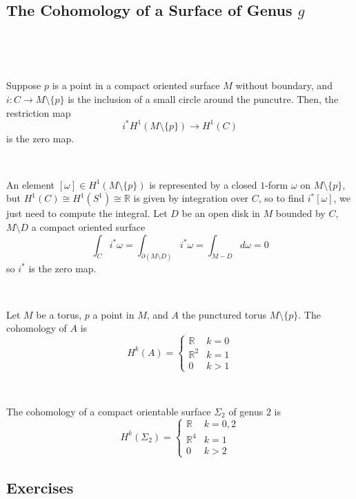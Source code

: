 \documentclass{article}
\begin{document}
\subsection{The Cohomology of a Surface of Genus $g$}
\

\begin{lemma}
\

Suppose $p$ is a point in a compact oriented surface $M$ without boundary, and $i: C \to M \setminus \{p\}$ is the inclusion of a small circle around the puncutre. Then, the restriction map $$i^* H^1(M \setminus \{p\}) \to H^1(C)$$is the zero map.
\end{lemma}

\begin{customproof}
\

An element $[\omega] \in H^1(M \setminus \{p\})$ is represented by a closed $1$-form $\omega$ on $M \setminus \{p\}$, but $H^1(C) \cong H^1(S^1) \cong \mathbb{R}$ is given by integration over $C$, so to find $i^*[\omega]$, we just need to compute the integral. Let $D$ be an open disk in $M$ bounded by $C$, $M\setminus D$ a compact oriented surface $$\int_C i^*\omega = \int_{\partial (M \setminus D)} i^* \omega = \int_{M-D} d\omega = 0$$so $i^*$ is the zero map.
\end{customproof}

\begin{proposition}
\

Let $M$ be a torus, $p$ a point in $M$, and $A$ the punctured torus $M \setminus \{p\}$. The cohomology of $A$ is $$H^k(A) = \begin{cases}
  \mathbb{R} & k=0\\
  \mathbb{R}^2 & k=1\\
  0 & k > 1
\end{cases}$$
\end{proposition}


\begin{proposition}
\

The cohomology of a compact orientable surface $\Sigma_2$ of genus $2$ is $$H^k(\Sigma_2) = \begin{cases}
  \mathbb{R} & k = 0,2\\
  \mathbb{R}^4 & k = 1\\
  0 & k > 2
\end{cases}$$
\end{proposition}

\subsection{Exercises}
\
\end{document}
